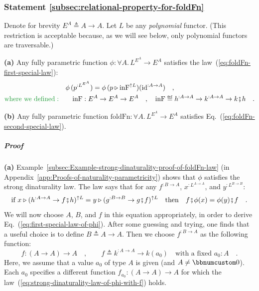 \subsubsection{Statement \label{subsec:relational-property-for-foldFn}\ref{subsec:relational-property-for-foldFn}}

Denote for brevity $E^{A}\triangleq A\rightarrow A$. Let $L$ be
any \emph{polynomial} functor. (This restriction is acceptable because,
as we will see below, only polynomial functors are traversable.)

\textbf{(a)} Any fully parametric function $\phi:\forall A.\,L^{E^{A}}\rightarrow E^{A}$
satisfies the law~(\ref{eq:foldFn-first-special-law}):
\begin{align}
 & \phi\,(p^{:L^{E^{A}}})=\phi\,(p\triangleright\text{inF}^{\uparrow L})(\text{id}^{:A\rightarrow A})\quad,\label{eq:first-special-law-of-phi}\\
{\color{greenunder}\text{where we defined}:}\quad & \quad\text{inF}:E^{A}\rightarrow E^{A}\rightarrow E^{A}\quad,\quad\text{inF}\triangleq h^{:A\rightarrow A}\rightarrow k^{:A\rightarrow A}\rightarrow k\bef h\quad.\nonumber 
\end{align}

\textbf{(b)} Any fully parametric function $\text{foldFn}:\forall A.\,L^{E^{A}}\rightarrow E^{A}$
satisfies Eq.~(\ref{eq:foldFn-second-special-law}).

\subparagraph{Proof}

\textbf{(a)} Example~\ref{subsec:Example-strong-dinaturality-proof-of-foldFn-law}
(in Appendix~\ref{app:Proofs-of-naturality-parametricity}) shows
that $\phi$ satisfies the strong dinaturality law. The law says that
for any $f^{:B\rightarrow A}$, $x^{:L^{A\rightarrow A}}$, and $y^{:L^{B\rightarrow B}}$:
\begin{equation}
\text{if }x\triangleright(h^{:A\rightarrow A}\rightarrow f\bef h)^{\uparrow L}=y\triangleright(g^{:B\rightarrow B}\rightarrow g\bef f)^{\uparrow L}\quad\text{then}\quad f\bef\phi(x)=\phi(y)\bef f\quad.\label{eq:strong-dinaturality-law-of-phi-with-f}
\end{equation}
We will now choose $A$, $B$, and $f$ in this equation appropriately,
in order to derive Eq.~(\ref{eq:first-special-law-of-phi}). After
some guessing and trying, one finds that a useful choice is to define
$B\triangleq A\rightarrow A$. Then we choose $f^{:B\rightarrow A}$
as the following function:
\begin{equation}
f:(A\rightarrow A)\rightarrow A\quad,\quad\quad f\triangleq k^{:A\rightarrow A}\rightarrow k(a_{0})\quad\text{with a fixed }a_{0}:A\quad.\label{eq:f-for-relational-law-of-foldFn-derivation1}
\end{equation}
Here, we assume that a value $a_{0}$ of type $A$ is given (and $A\neq\bbnum 0$).
Each $a_{0}$ specifies a different function $f_{a_{0}}:(A\rightarrow A)\rightarrow A$
for which the law~(\ref{eq:strong-dinaturality-law-of-phi-with-f})
holds. 

